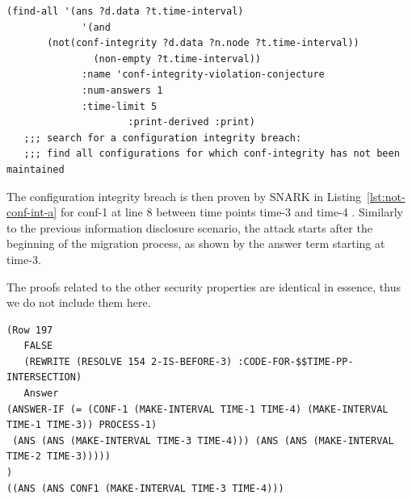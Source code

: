 \begin{lstlisting}[caption=SNARK question to detect the configuration integrity violation., label=lst:not-conf-int-q,captionpos=b] 
   (find-all '(ans ?d.data ?t.time-interval)
             '(and
       (not(conf-integrity ?d.data ?n.node ?t.time-interval))
               (non-empty ?t.time-interval))
             :name 'conf-integrity-violation-conjecture
             :num-answers 1
             :time-limit 5
                     :print-derived :print)
   ;;; search for a configuration integrity breach:
   ;;; find all configurations for which conf-integrity has not been maintained
\end{lstlisting}

The configuration integrity breach is then proven by SNARK in Listing~\ref{lst:not-conf-int-a} for conf-1 at line 8 between time points time-3 and time-4 .
Similarly to the previous information disclosure scenario, the attack starts after the beginning of the migration process, as shown by the answer term starting at time-3.

The proofs related to the other security properties are identical in essence, thus we do not include them here.

\begin{lstlisting}[caption=SNARK detecting the configuration integrity violation., label=lst:not-conf-int-a,captionpos=b] 
(Row 197
   FALSE
   (REWRITE (RESOLVE 154 2-IS-BEFORE-3) :CODE-FOR-$$TIME-PP-INTERSECTION)
   Answer 
(ANSWER-IF (= (CONF-1 (MAKE-INTERVAL TIME-1 TIME-4) (MAKE-INTERVAL TIME-1 TIME-3)) PROCESS-1)
 (ANS (ANS (MAKE-INTERVAL TIME-3 TIME-4))) (ANS (ANS (MAKE-INTERVAL TIME-2 TIME-3)))))
)
((ANS (ANS CONF1 (MAKE-INTERVAL TIME-3 TIME-4)))

\end{lstlisting}

